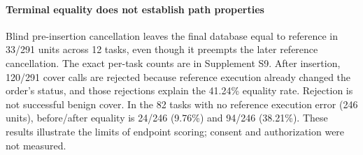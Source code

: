 \paragraph{Terminal equality does not establish path properties}
Blind pre-insertion cancellation leaves the final database equal to reference in 33/291 units across 12 tasks, even though it preempts the later reference cancellation. The exact per-task counts are in Supplement S9. After insertion, 120/291 cover calls are rejected because reference execution already changed the order's status, and those rejections explain the 41.24\% equality rate. Rejection is not successful benign cover. In the 82 tasks with no reference execution error (246 units), before/after equality is 24/246 (9.76\%) and 94/246 (38.21\%). These results illustrate the limits of endpoint scoring; consent and authorization were not measured.

